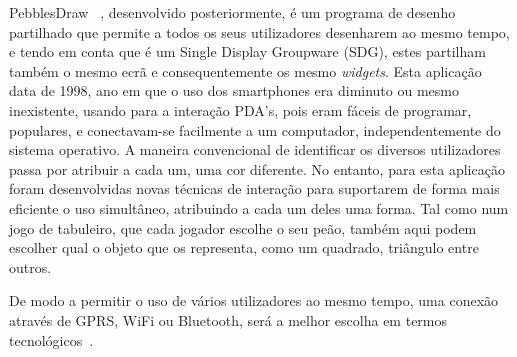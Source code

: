 PebblesDraw ~\cite{Myers1998a}, desenvolvido posteriormente,  é um programa de desenho partilhado que permite a todos os seus utilizadores desenharem ao mesmo tempo, e tendo em conta que é um Single Display Groupware (SDG), estes partilham também o mesmo ecrã e consequentemente os mesmo \textit{widgets}. Esta aplicação data de 1998, ano em que o uso dos smartphones era diminuto ou mesmo inexistente, usando para a interação PDA’s, pois eram fáceis de programar, populares, e conectavam-se facilmente a um computador, independentemente do sistema operativo. 
A maneira convencional de identificar os diversos utilizadores passa por atribuir a cada um, uma cor diferente. No entanto, para esta aplicação foram desenvolvidas novas técnicas de interação para suportarem de forma mais eficiente o uso simultâneo, atribuindo a cada um deles uma forma. Tal como num jogo de tabuleiro, que cada jogador escolhe o seu peão, também aqui podem escolher qual o objeto que os representa, como um quadrado, triângulo entre outros.

De modo a permitir o uso de vários utilizadores ao mesmo tempo, uma conexão através de GPRS, WiFi ou Bluetooth, será a melhor escolha em termos tecnológicos~\cite{Ballagas}.


